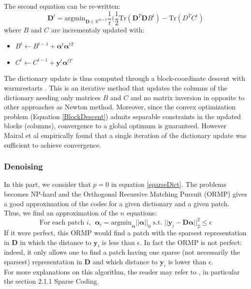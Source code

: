 \documentclass{ipol}
\newcommand{\psize}{m}
\newcommand{\dsize}{k}
\newcommand{\dict}{\textbf{D}}
\newcommand{\code}{\bm{\alpha}}
\newcommand{\pnorm}{p}
\newcommand{\noi}{\textbf{y}}
\newcommand{\RR}{\mathbb{R}}
\newcommand{\argmin}{\text{argmin}}
\begin{document}
The second equation can be re-written:
\begin{equation}
	\dict^{t}= \argmin_{\dict \in \RR^{\psize \times \dsize}} \frac{1}{t} (\frac{1}{2} \text{Tr}(\dict^T \dict B^t)- \text{Tr}(D^T C^t )
	\label{BlockDescent}
\end{equation}
where $B$ and $C$ are incrementaly updated with:
\begin{itemize}
	\item $B^t \leftarrow B^{t-1} + \code^t \code^{tT}$
	\item $C^t \leftarrow C^{t-1} + \noi^t \code^{tT}$
\end{itemize}
The dictionary update is thus computed through a block-coordinate descent with warmrestarts \cite{BlockDescent}. This is an iterative method that updates the columns of the dictionary needing only matrices $B$ and $C$ and no matrix inversion in opposite to other approaches as Newton method. Moreover, since the convex optimization problem (Equation \eqref{BlockDescent}) admits separable constraints in the updated blocks (columns), convergence to a global optimum is guaranteed. However Mairal et al empirically found that a single iteration of the dictionary update was sufficient to achieve convergence.

\subsubsection{Denoising}

In this part, we consider that $\pnorm = 0$ in equation \eqref{sparseDict}. The problems becomes NP-hard and the Orthogonal Recursive Matching Pursuit (ORMP) gives a good approximation of the codes for a given dictionary and a given patch. Thus, we find an approximation of the $n$ equations:
\begin{equation}
	\text{For each patch } i, \ \ \code_i = \argmin_{\code} ||\code||_0 \text{ s.t. } ||\noi_i - \dict \code||_2^2 \leq \epsilon
\label{eqORMP}
\end{equation}
If it were perfect, this ORMP would find a patch with the sparsest representation in $\dict$ in which the distance to $\noi_i$ is less than $\epsilon$. In fact the ORMP is not perfect: indeed, it only allows one to find a patch having one sparse (not necessarily the sparsest) representation in $\dict$ and which distance to $\noi_i$ is lower than $\epsilon$.\\
For more explanations on this algorithm, the reader may refer to \cite{KSVD}, in particular the section 2.1.1 Sparse Coding.
\end{document}
